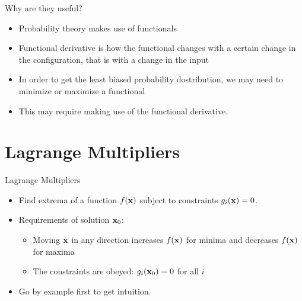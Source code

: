 \documentclass{beamer}
\begin{document}
\begin{frame}{Why are they useful?}
  \begin{itemize}
  \item Probability theory makes use of functionals
  \item Functional derivative is how the functional changes with a certain change in the configuration, that is with a change in the input
  \item In order to get the least biased probability dostribution, we may need to minimize or maximize a functional
  \item This may require making use of the functional derivative.
  \end{itemize}
\end{frame}
\section{Lagrange Multipliers}
\begin{frame}{Lagrange Multipliers}
  \begin{itemize}
  \item Find extrema of a function $f(\vb{x})$ subject to constraints $g_i(\vb{x})=0$.
  \item Requirements of solution $\vb{x}_0$:
    \begin{itemize}
    \item Moving $\vb{x}$ in any direction increases $f(\vb{x})$ for minima and decreases $f(\vb{x})$ for maxima
    \item The constraints are obeyed: $g_i(\vb{x}_0)=0$ for all $i$
    \end{itemize}
  \item Go by example first to get intuition.
  \end{itemize}
\end{frame}
\end{document}
